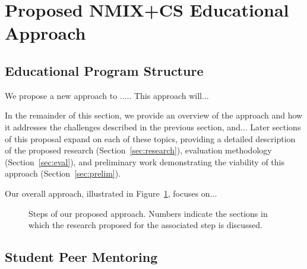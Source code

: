 \section{Proposed NMIX+CS Educational Approach}
\label{sec:approach}

\subsection{Educational Program Structure}

We propose a new approach to .....
This approach will... 

In the remainder of this section, we provide an overview of the approach and how it 
addresses the challenges described in the previous section, and...
Later sections of this proposal
expand on each of these topics, providing a detailed description of the
proposed research (Section~\ref{sec:research}), evaluation methodology
(Section~\ref{sec:eval}), and preliminary work demonstrating the viability of
this approach (Section~\ref{sec:prelim}).

Our overall approach, illustrated in Figure~\ref{fig:overview}, focuses on...
\begin{figure}
\begin{center}
\end{center}
\caption{Steps of our proposed approach. Numbers indicate the sections in which the research 
  proposed for the associated step is discussed.}
\label{fig:overview}
\end{figure}

\subsection{Student Peer Mentoring}

